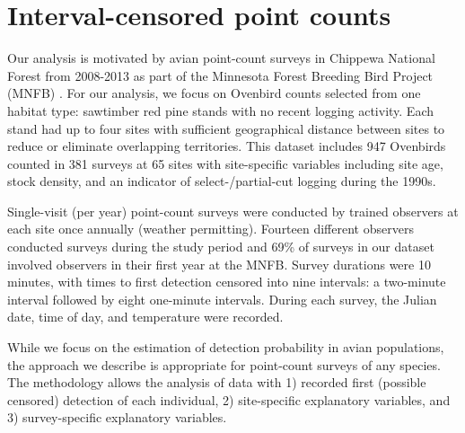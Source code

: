 \documentclass[12pt]{article}
\begin{document}
\section{Interval-censored point counts}\label{sec:data}

Our analysis is motivated by avian point-count surveys in Chippewa National Forest from 2008-2013 as part of the Minnesota Forest Breeding Bird Project (MNFB) \citep{Hanowski1995}.  
For our analysis, we focus on Ovenbird counts selected from one habitat type: sawtimber red pine stands with no recent logging activity.  
Each stand had up to four sites with sufficient geographical distance between sites to reduce or eliminate overlapping territories.
This dataset includes 947 Ovenbirds counted in 381 surveys at 65 sites with site-specific variables including site age,  stock density, and an indicator of select-/partial-cut logging during the 1990s.

Single-visit (per year) point-count surveys were conducted by trained observers at each site once annually (weather permitting).  
Fourteen different observers conducted surveys during the study period and 69\% of surveys in our dataset involved observers in their first year at the MNFB.  
Survey durations were 10 minutes, with times to first detection censored into nine intervals: a two-minute interval followed by eight one-minute intervals.  
During each survey, the Julian date, time of day, and temperature were recorded. 

While we focus on the estimation of detection probability in avian populations, the approach we describe is appropriate for point-count surveys of any species.
The methodology allows the analysis of data with 1) recorded first (possible censored) detection of each individual, 2) site-specific explanatory variables, and 3) survey-specific explanatory variables.  
\end{document}
